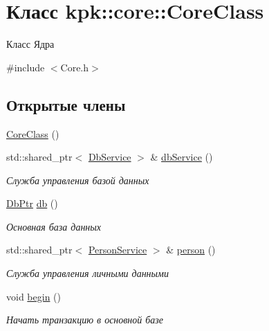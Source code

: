 \hypertarget{classkpk_1_1core_1_1_core_class}{}\section{Класс kpk\+:\+:core\+:\+:Core\+Class}
\label{classkpk_1_1core_1_1_core_class}


Класс Ядра  




{\ttfamily \#include $<$Core.\+h$>$}

\subsection*{Открытые члены}
\begin{DoxyCompactItemize}
\item 
\hyperlink{classkpk_1_1core_1_1_core_class_a5dc08a07fb3d8e84da07623d7739261a}{Core\+Class} ()
\item 
std\+::shared\+\_\+ptr$<$ \hyperlink{classkpk_1_1core_1_1_db_service}{Db\+Service} $>$ \& \hyperlink{classkpk_1_1core_1_1_core_class_ac3d5e1bb072ace0ad6b55e93d61f8482}{db\+Service} ()
\begin{DoxyCompactList}\small\item\em Служба управления базой данных \end{DoxyCompactList}\item 
\hyperlink{namespacekpk_1_1core_a466e66f45327171cc2976df1304573ab}{Db\+Ptr} \hyperlink{classkpk_1_1core_1_1_core_class_aeb0cc8cb53c4ab4dc945226bd4f349d2}{db} ()
\begin{DoxyCompactList}\small\item\em Основная база данных \end{DoxyCompactList}\item 
std\+::shared\+\_\+ptr$<$ \hyperlink{classkpk_1_1core_1_1_person_service}{Person\+Service} $>$ \& \hyperlink{classkpk_1_1core_1_1_core_class_a069b9845931bb50a9fc221ff3e436862}{person} ()
\begin{DoxyCompactList}\small\item\em Служба управления личными данными \end{DoxyCompactList}\item 
void \hyperlink{classkpk_1_1core_1_1_core_class_addd4edd20d222119a0ddc384ee73cfb9}{begin} ()
\begin{DoxyCompactList}\small\item\em Начать транзакцию в основной базе \end{DoxyCompactList}\item 

\end{DoxyCompactItemize}
